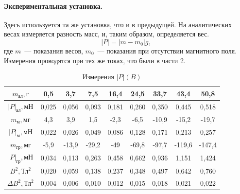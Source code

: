 \documentclass[12pt,a4paper]{article}
\begin{document}
\paragraph{Экспериментальная установка.} Здесь используется та же установка, что и в предыдущей. На аналитических весах измеряется разность масс, и, таким образом, определяется вес.
\begin{equation}
|P| = |m - m_0|g,
\end{equation}
где $m$~--- показания весов, $m_0$~--- показания при отсутствии магнитного поля. Измерения проводятся при тех же токах, что были в части 2.
\begin{table}[h!]\centering
\begin{tabular}{|*{9}{c|}}
\hline
$m_{\text{ал}}, \text{г}$&0,5&3,7&7,5&16,4&24,5&33,7&43,4&50,8\\
\hline
$|P|_{\text{ал}}, \text{мН}$&0,025&0,056&0,093&0,181&0,260&0,350&0,445&0,518\\
\hline
$m_{\text{м}}, \text{мг}$&4,3&3,9&1,5&-2,3&-6,5&-10,9&-15,2&-19,7\\
\hline
$|P|_{\text{м}}, \text{мН}$&0,022&0,026&0,049&0,086&0,128&0,171&0,213&0,257\\
\hline
$m_{\text{гр}}, \text{мг}$&-5,9&-13,9&-29,2&-49&-69,8&-97,7&-119,6&-147,4\\
\hline
$|P|_{\text{гр}}, \text{мН}$&0,034&0,113&0,263&0,458&0,662&0,936&1,151&1,424\\
\hline
$B^2, \text{Тл}^2$&0,020&0,059&0,138&0,237&0,348&0,497&0,642&0,760\\
\hline
$\Delta B^2, \text{Тл}^2$&0,004&0,006&0,010&0,012&0,015&0,018&0,021&0,022\\
\hline
\end{tabular}
\caption{Измерения $|P|(B)$}
\end{table}
\end{document}
